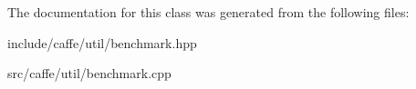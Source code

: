The documentation for this class was generated from the following files\+:\begin{DoxyCompactItemize}
\item 
include/caffe/util/benchmark.\+hpp\item 
src/caffe/util/benchmark.\+cpp\end{DoxyCompactItemize}
